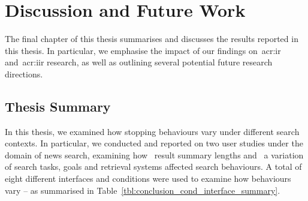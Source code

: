 
\chapter[Discussion and Future Work]{Discussion and Future Work}\label{chap:conclusions}
The final chapter of this thesis summarises and discusses the results reported in this thesis. In particular, we emphasise the impact of our findings on~\gls{acr:ir} and~\gls{acr:iir} research, as well as outlining several potential future research directions.


\section{Thesis Summary}\label{sec:conclusions:summary}
In this thesis, we examined how stopping behaviours vary under different search contexts. In particular, we conducted and reported on two user studies under the domain of news search, examining how~ result summary lengths and~ a variation of search tasks, goals and retrieval systems affected search behaviours. A total of eight different interfaces and conditions were used to examine how behaviours vary -- as summarised in Table~\ref{tbl:conclusion_cond_interface_summary}.

